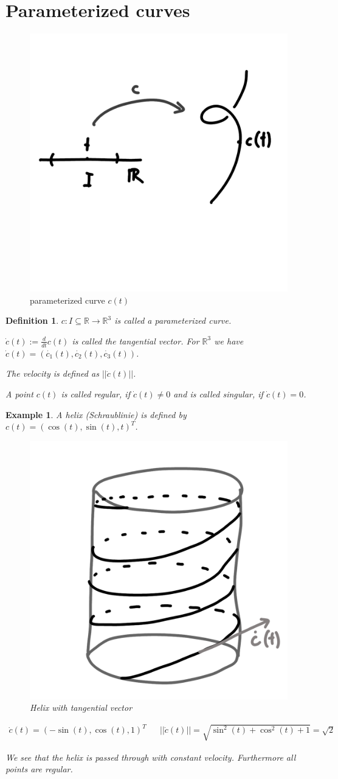 \documentclass[]{article}
\newtheorem{definition}{Definition}
\newtheorem{example}{Example}
\begin{document}
\section{Parameterized curves}

\begin{figure}[h!]
	\centering
	\includegraphics[width=0.3\linewidth]{figures/parameterized_curve}
	\caption{parameterized curve $c(t)$}
	\label{fig:parameterizedcurve}
\end{figure}

\begin{definition}
	$c:I\subseteq \mathbb{R} \rightarrow \mathbb{R}^3$ is called a parameterized curve.
	 
	
	$\dot{c}(t) := \frac{d}{dt} c(t)$ is called the tangential vector. For $\mathbb{R}^3$ we have $\dot{c}(t) = (\dot{c_1}(t), \dot{c_2}(t), \dot{c_3}(t))$.

	The velocity is defined as $|| \dot{c}(t) ||$.
	
	A point $c(t)$ is called regular, if $\dot{c}(t) \not= 0$ and is called singular, if $\dot{c}(t) = 0$.
\end{definition}

\begin{example}
	A helix (Schraublinie) is defined by $c(t) = (\cos(t), \sin(t), t)^T$.
	
	\begin{figure}[h!]
		\centering
		\includegraphics[width=0.3\linewidth]{figures/helix}
		\caption{Helix with tangential vector}
		\label{fig:helix}
	\end{figure}
	
	\begin{align*}
		\dot{c}(t) = (-\sin(t), \cos(t), 1)^T && ||\dot{c}(t)|| = \sqrt{\sin^2(t) + \cos^2(t) + 1} = \sqrt{2}
	\end{align*}
	
	We see that the helix is passed through with constant velocity. Furthermore all points are regular.
\end{example}
\end{document}
